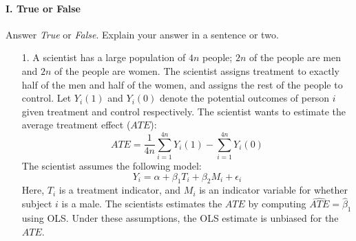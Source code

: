 \documentclass{article}
\newcommand{\E}[0]{\mathbb{E}}
\begin{document}
\paragraph{\Large I. True or False}
Answer {\em True} or {\em False}.  Explain your answer in a sentence or two.
\begin{itemize}


\item[1.]   
      A scientist has a large population of $4n$ people;
      $2n$ of the people are men and $2n$ of the people are women.
      The scientist assigns treatment to exactly half of the men and half of the women,
      and assigns the rest of the people to control.
      Let $Y_i(1)$ and $Y_i(0)$ denote the potential outcomes
      of person $i$ given treatment and control respectively.
      The scientist wants to estimate the average treatment effect ($ATE$):
      $$
        ATE = \frac{1}{4n}\sum_{i=1}^{4n}Y_i(1) - \sum_{i=1}^{4n} Y_i(0)
      $$
      The scientist assumes the following model:
      $$
        Y_i = \alpha + \beta_1 T_i + \beta_2 M_i + \epsilon_i
      $$
      Here, $T_i$ is a treatment indicator, and
      $M_i$ is an indicator variable for whether
      subject $i$ is a male.
      The scientists estimates the $ATE$ by computing $\widehat{ATE} = \hat\beta_1$ 
      using OLS. 
      Under these assumptions, the OLS estimate is unbiased for the $ATE$.



\end{itemize}
\end{document}
